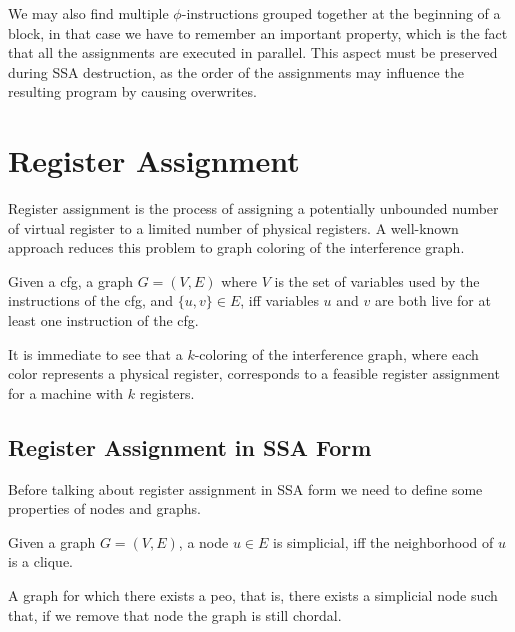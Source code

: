 We may also find multiple $\phi$-instructions grouped together at the beginning of a block, in that case we have to remember an important property, which is the fact that all the assignments are executed in parallel. This aspect must be preserved during SSA destruction, as the order of the assignments may influence the resulting program by causing overwrites.

\section{Register Assignment}
\label{sec:ra}

Register assignment is the process of assigning a potentially unbounded number of virtual register to a limited number of physical registers. A well-known approach reduces this problem to graph coloring of the interference graph.

\begin{definition}\label{def:ig}
    Given a \gls{cfg}, a graph $G = (V, E)$ where $V$ is the set of variables used by the instructions of the \gls{cfg}, and $\{ u, v \} \in E$, iff variables $u$ and $v$ are both live for at least one instruction of the \gls{cfg}.
\end{definition}

It is immediate to see that a $k$-coloring of the interference graph, where each color represents a physical register, corresponds to a feasible register assignment for a machine with $k$ registers.

\subsection{Register Assignment in SSA Form}
\label{subsec:ssara}

Before talking about register assignment in SSA form we need to define some properties of nodes and graphs.

\begin{definition}\label{def:simplicial}
    Given a graph $G = (V, E)$, a node $u \in E$ is simplicial, iff the neighborhood of $u$ is a clique.
\end{definition}

\begin{definition}\label{def:chordal}
    A graph for which there exists a \gls{peo}, that is, there exists a simplicial node such that, if we remove that node the graph is still chordal.
\end{definition}

